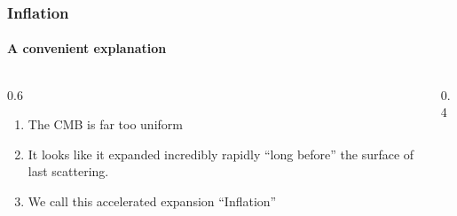 \begin{frame}
  \frametitle{Inflation}
  \framesubtitle{A convenient explanation}

  \begin{columns}
    \begin{column}{0.6\textwidth}

      \begin{enumerate}
        \item<1-> The CMB is far too uniform
        \item<2-> It looks like it expanded incredibly rapidly ``long before'' the surface of last scattering.
        \item<4-> We call this accelerated expansion ``Inflation''
      \end{enumerate}

    \end{column}

    \begin{column}{0.4\textwidth}


    \end{column}
  \end{columns}



\end{frame}

